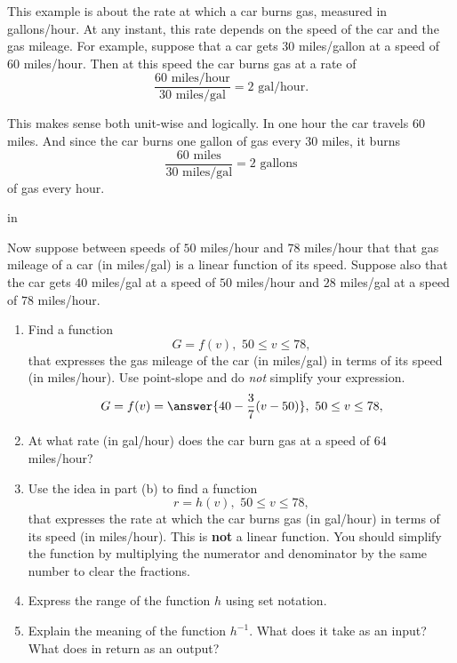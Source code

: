 \documentclass{ximera}
\newcommand{\pskip}{\vskip 0.1 in}
\begin{document}
\begin{example} \label{Ex4:Inverses}
This example is about the rate at which a car burns gas, measured in gallons/hour. At any instant, this rate depends on the speed of the car and the gas mileage. For example, suppose that a car gets 30 miles/gallon at a speed of 60 miles/hour. Then at this speed the car burns gas at a rate of
\[
     \frac{60 \text{ miles/hour}}{30 \text{ miles/gal}} = 2 \text{ gal/hour}.
\]

This makes sense both unit-wise and logically. In one hour the car travels 60 miles. And since the car burns one gallon of gas every 30 miles, it burns
\[
    \frac{60 \text{ miles}}{30 \text{ miles/gal}} = 2 \text{ gallons}
\]
of gas every hour.

\pskip

Now suppose between speeds of $50$ miles/hour and $78$ miles/hour that that gas mileage of a car (in miles/gal) is a linear function of its speed. Suppose also that the car gets $40$ miles/gal at a speed of $50$ miles/hour and $28$ miles/gal at a speed of $78$ miles/hour.

\begin{enumerate}

\item Find a function 
\[
     G = f(v)  ,  \,\, 50\leq v \leq 78 ,
\]
that expresses the gas mileage of the car (in miles/gal) in terms of its speed (in miles/hour). Use point-slope and do \emph{not} simplify your expression.
\[
    G = f(v) = \answer{40-\frac{3}{7}(v-50)} ,  \,\, 50\leq v \leq 78 ,
\]

\item At what rate (in gal/hour) does the car burn gas at a speed of $64$ miles/hour?

\item Use the idea in part (b) to find a function 
\[
     r=h(v) , \,\, 50\leq v \leq 78 ,
\]
that expresses the rate at which the car burns gas (in gal/hour) in terms of its speed (in miles/hour). This is {\bf not} a linear function. You should simplify the function by multiplying the numerator and denominator by the same number to clear the fractions. %

\item Express the range of the function $h$ using set notation.

\item Explain the meaning of the function $h^{-1}$. What does it take as an input? What does in return as an output?


\end{enumerate}
\end{example}
\end{document}
